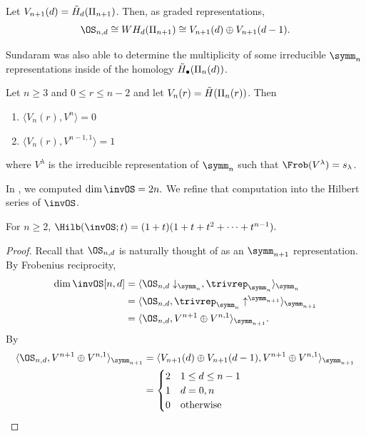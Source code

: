 \documentclass{amsart}
\begin{document}
\begin{corollary}\label{cor:OSnddirectsum}
    Let $V_{n+1}(d) = \Tilde{H}_d(\Pi_{n+1})$.
    Then, as graded representations,
    \[\OS_{n,d} \cong WH_{d}(\Pi_{n+1}) \cong V_{n+1}(d) \oplus V_{n+1}(d-1).\]
\end{corollary}

Sundaram \cite{sundaram} was also able to determine the multiplicity of some irreducible $\symm_n$ representations inside of the homology $\Tilde{H}_\bullet(\Pi_n(d))$.

\begin{lemma}{\cite[Cor.~2.3]{sundaram}}\label{lem:SundaramCor2.3}
    Let $n \geq 3$ and $0 \leq r \leq n-2$ and let $V_n(r) = \Tilde{H}(\Pi_n(r))$.
    Then
    \begin{enumerate}
        \item $\displaystyle \langle V_n(r), V^{n}\rangle = 0$
        \item $\displaystyle \langle V_n(r), V^{n-1,1} \rangle = 1$
    \end{enumerate}
    where $V^\lambda$ is the irreducible representation of $\symm_n$ such that $\Frob(V^\lambda) = s_\lambda$.
\end{lemma}


In , we computed $\dim \invOS = 2n.$
We refine that computation into the Hilbert series of $\invOS$.

\begin{proposition}\label{prop:OSinvariantHilb}
    For $n \geq 2$,
    $\Hilb(\invOS;t)=(1+t)(1+t+t^2 + \cdots + t^{n-1}).$
\end{proposition}

\begin{proof}
    
    Recall that $\OS_{n,d}$ is naturally thought of as an $\symm_{n+1}$ representation.
    By Frobenius reciprocity,
    \begin{align*}
        \dim {\invOS[n,d]}
        &= 
        \langle \OS_{n,d} \downarrow_{\symm_n},
        \trivrep_{\symm_n}\rangle_{\symm_n} \\
        &= 
        \langle \OS_{n,d}, \trivrep_{\symm_n}\uparrow^{\symm_{n+1}}\rangle_{\symm_{n+1}}\\
        &=\langle \OS_{n,d}, 
        V^{n+1} \oplus V^{n,1}\rangle_{\symm_{n+1}}.
    \end{align*}
    By 
    \begin{align*}
        \langle \OS_{n,d}, 
        V^{n+1} \oplus V^{n,1}\rangle_{\symm_{n+1}}
        &=
        \langle 
            V_{n+1}(d) \oplus V_{n+1}(d-1),
            V^{n+1} \oplus V^{n,1}\rangle_{\symm_{n+1}}
        \\
        &= \begin{cases}
            2 & 1 \leq d \leq n-1\\
            1 & d=0,n\\
            0 & \text{otherwise}
        \end{cases}\qedhere
    \end{align*}
\end{proof}
\end{document}
